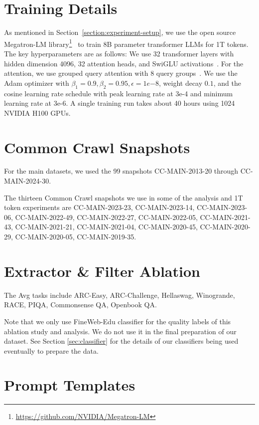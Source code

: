 \documentclass[11pt]{article}
\begin{document}
\section{Training Details}
\label{appendix:hyperparameters}
As mentioned in Section~\ref{section:experiment-setup},
we use the open source Megatron-LM library\footnote{\url{https://github.com/NVIDIA/Megatron-LM}}~\citep{shoeybi2019megatron} to train 8B parameter transformer LLMs for 1T tokens. The key hyperparameters are as follows: We use 32 transformer layers with hidden dimension 4096, 32 attention heads, and SwiGLU activations~\cite{shazeer2020glu}. For the attention, we use grouped query attention with 8 query groups~\citep{ainslie2023gqa}. We use the Adam optimizer with $\beta_1 = 0.9, \beta_2 = 0.95, \epsilon=1e{-8}$, weight decay $0.1$, and the cosine learning rate schedule with peak learning rate at 3e-4 and minimum learning rate at 3e-6. A single training run takes about 40 hours using 1024 NVIDIA H100 GPUs.

\section{Common Crawl Snapshots} \label{sec:13_snapshots}

For the main datasets, we used the 99 snapshots CC-MAIN-2013-20 through CC-MAIN-2024-30.

The thirteen Common Crawl snapshots we use in some of the analysis and 1T token experiments are 
CC-MAIN-2023-23,     CC-MAIN-2023-14,     CC-MAIN-2023-06,     CC-MAIN-2022-49,     CC-MAIN-2022-27,     CC-MAIN-2022-05,     CC-MAIN-2021-43,     CC-MAIN-2021-21,     CC-MAIN-2021-04,     CC-MAIN-2020-45,     CC-MAIN-2020-29,     CC-MAIN-2020-05,     CC-MAIN-2019-35.

\section{Extractor \& Filter Ablation} \label{sec:non_mmlu}

The Avg tasks include ARC-Easy, ARC-Challenge, Hellaswag, Winogrande, RACE, PIQA, Commonsense QA, Openbook QA. 

Note that we only use FineWeb-Edu classifier for the quality labels of this ablation study and analysis. We do not use it in the final preparation of our dataset. See Section \ref{sec:classifier} for the details of our classifiers being used eventually to prepare the data.

\section{Prompt Templates}
\label{sec:appendix-prompt-templates}
\end{document}
